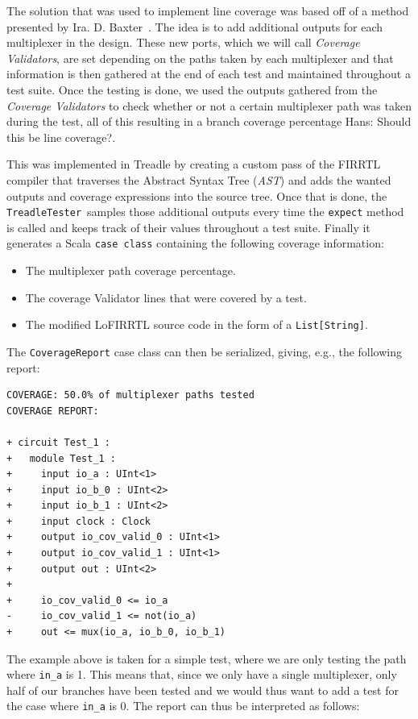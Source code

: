\documentclass[conference]{IEEEtran}
\newcommand{\hjd}[1]{{\color{pink} Hans: #1}}
\begin{document}
The solution that was used to implement line coverage was based off of a method presented by Ira. D. Baxter~\cite{branch-cov-made-easy:2002}. The idea is to add additional outputs for each multiplexer in the design. These new ports, which we will call \textit{Coverage Validators}, are set depending on the paths taken by each multiplexer and that information is then gathered at the end of each test and maintained throughout a test suite. Once the testing is done, we used the outputs gathered from the \textit{Coverage Validators} to check whether or not a certain multiplexer path was taken during the test, all of this resulting in a branch coverage percentage \hjd{Should this be line coverage?}.

This was implemented in Treadle by creating a custom pass of the FIRRTL compiler that traverses the Abstract Syntax Tree (\textit{AST}) and adds the wanted outputs and coverage expressions into the source tree. Once that is done, the \texttt{TreadleTester} samples those additional outputs every time the \texttt{expect} method is called and keeps track of their values throughout a test suite. Finally it generates a Scala \texttt{case class} containing the following coverage information:

\begin{itemize}
  \item The multiplexer path coverage percentage.
  \item The coverage Validator lines that were covered by a test.
  \item The modified LoFIRRTL source code in the form of a \texttt{List[String]}.
\end{itemize}

The \texttt{CoverageReport} case class can then be serialized, giving, e.g., the following report:
\begin{verbatim}
COVERAGE: 50.0% of multiplexer paths tested
COVERAGE REPORT:

+ circuit Test_1 :
+   module Test_1 :
+     input io_a : UInt<1>
+     input io_b_0 : UInt<2>
+     input io_b_1 : UInt<2>
+     input clock : Clock
+     output io_cov_valid_0 : UInt<1>
+     output io_cov_valid_1 : UInt<1>
+     output out : UInt<2>
+   
+     io_cov_valid_0 <= io_a
-     io_cov_valid_1 <= not(io_a)
+     out <= mux(io_a, io_b_0, io_b_1)
\end{verbatim}
The example above is taken for a simple test, where we are only testing the path where \texttt{in\_a} is 1. This means that, since we only have a single multiplexer, only half of our branches have been tested and we would thus want to add a test for the case where \texttt{in\_a} is 0. The report can thus be interpreted as follows:
\end{document}
